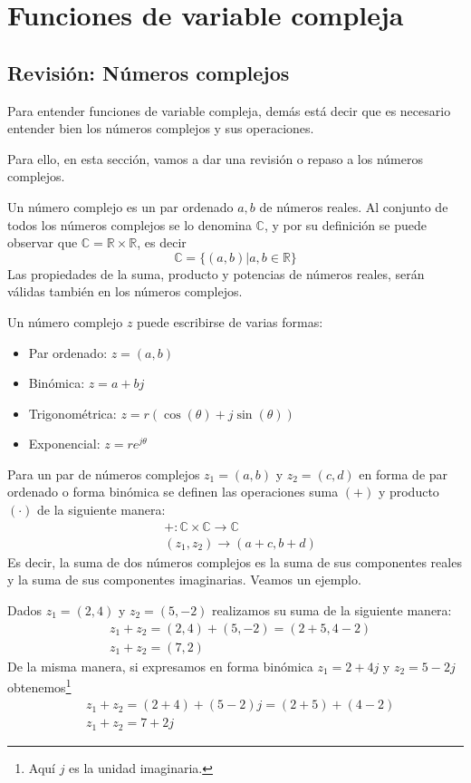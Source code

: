 \chapter{Funciones de variable compleja}
\section[Números complejos]{Revisión: Números complejos}

Para entender funciones de variable compleja, demás está decir que es necesario entender bien los números complejos y sus operaciones. 

Para ello, en esta sección, vamos a dar una revisión o repaso a los números complejos.

\begin{definition}
  Un número complejo es un par ordenado \(a,b\) de números reales. Al conjunto de todos los números complejos se lo denomina $\mathbb{C}$, y por su definición se puede observar que $\mathbb{C}=\mathbb{R}\times\mathbb{R}$, es decir 
  $$
  \mathbb{C}=\{(a,b)|a,b \in \mathbb{R}\}
  $$
  Las propiedades de la suma, producto y potencias de números reales, serán válidas también en los números complejos.
\end{definition}

Un número complejo $z$ puede escribirse de varias formas:
\begin{itemize}
  \item Par ordenado: $z=(a,b)$
  \item Binómica: $z=a+bj$
  \item Trigonométrica: $z=r(\cos(\theta)+j\sin(\theta))$
  \item Exponencial: $z=re^{j\theta}$
\end{itemize}

Para un par de números complejos $z_1=(a,b)$ y $z_2=(c,d)$ en forma de par ordenado o forma binómica se definen las operaciones suma $(+)$ y producto $(\cdot)$ de la siguiente manera:
\begin{align*}
  &+:\mathbb{C}\times\mathbb{C}\to \mathbb{C} \\
  &(z_1,z_2)\rightarrow (a+c,b+d)
\end{align*}
Es decir, la suma de dos números complejos es la suma de sus componentes reales y la suma de sus componentes imaginarias. Veamos un ejemplo.
\begin{example}
  Dados $z_1=(2,4)$ y $z_2=(5,-2)$ realizamos su suma de la siguiente manera:
  \begin{align*}
    &z_1+z_2 = (2,4) + (5,-2) = (2+5,4-2) \\
    &\boxed{z_1+z_2 = (7,2)}
  \end{align*}
  De la misma manera, si expresamos en forma binómica $z_1=2+4j$ y $z_2=5-2j$ obtenemos\footnote{Aquí $j$ es la unidad imaginaria.}
  \begin{align*}
    &z_1+z_2 = (2+4) + (5-2)j = (2+5) + (4-2) \\
    &\boxed{z_1+z_2 = 7+2j}
  \end{align*}
\end{example}

